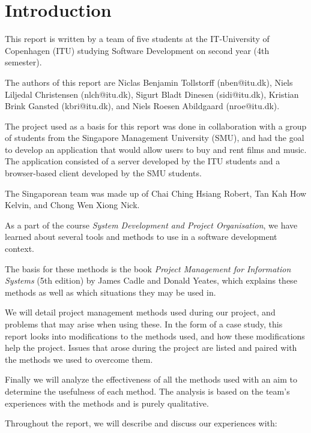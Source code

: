 \section{Introduction}

This report is written by a team of five students at the IT-University of Copenhagen (ITU)
studying Software Development on second year (4th semester).

The authors of this report are Niclas Benjamin Tollstorff (nben@itu.dk), Niels Liljedal
Christensen (nlch@itu.dk), Sigurt Bladt Dinesen (sidi@itu.dk), Kristian Brink Gansted
(kbri@itu.dk), and Niels Roesen Abildgaard (nroe@itu.dk).

The project used as a basis for this report was done in collaboration with a group of
students from the Singapore Management University (SMU), and had the goal to develop an
application that would allow users to buy and rent films and music. The application consisted
of a server developed by the ITU students and a browser-based client developed by the SMU
students.

The Singaporean team was made up of Chai Ching Hsiang Robert, Tan Kah How Kelvin, and
Chong Wen Xiong Nick.

As a part of the course \emph{System Development and Project Organisation}, we have learned
about several tools and methods to use in a software development context.

The basis for these methods is the book \emph{Project Management for Information Systems}
(5th edition) by James Cadle and Donald Yeates, which explains these methods as well
as which situations they may be used in.

We will detail project management methods used during our project, and problems that may arise
when using these. In the form of a case study, this report looks into modifications to the
methods used, and how these modifications help the project. Issues that arose during the project
are listed and paired with the methods we used to overcome them.

Finally we will analyze the effectiveness of all the methods used with an aim to determine
the usefulness of each method. The analysis is based on the team’s experiences with the
methods and is purely qualitative.

Throughout the report, we will describe and discuss our experiences with:

